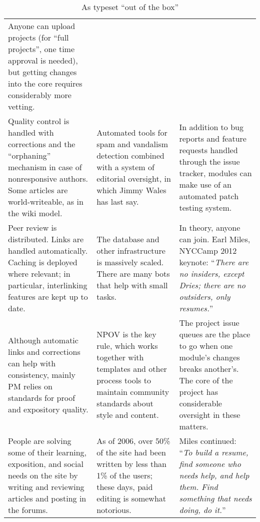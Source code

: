 \documentclass[article,a4paper,12pt,twoside]{memoir}
\newcounter{123listcolonstylectr}
\begin{document}
\begin{table}
\begin{center}
{\begin{tabular}{|p{}|p{}|p{}|}
Anyone can upload projects (for ``full projects'', one time approval
is needed), but getting changes into the core requires considerably
more vetting. \\
Quality control is handled with corrections and the ``orphaning'' mechanism
in case of nonresponsive authors.  Some articles are world-writeable,
as in the wiki model. & Automated tools for spam and vandalism detection
combined with a system of editorial oversight, in which Jimmy Wales
has last say. & In addition to bug reports and feature requests handled
through the issue tracker, modules can make use of an automated patch
testing system.\\
Peer review is distributed.  Links are handled automatically.  Caching
is deployed where relevant; in particular, interlinking features are
kept up to date. & The database and other infrastructure is massively
scaled. There are many bots that help with small tasks. & In theory,
anyone can join.  Earl Miles, NYCCamp 2012 keynote: ``\emph{There are
  no insiders, except Dries; there are no outsiders, only resumes.}''
\\
Although automatic links and corrections can help with consistency,
mainly PM relies on standards for proof and expository quality.
&NPOV is the key rule, which works together with templates and other
process tools to maintain community standards about style and
content. & The project issue queues are the place to go when one
module's changes breaks another's. The core of the project has
considerable oversight in these
matters.\\
People are solving some of their learning, exposition, and social
needs on the site by writing and reviewing articles and posting in the
forums.& As of 2006, over 50\% of the site had been written by less
than 1\% of the users; these days, paid editing is somewhat
notorious.& Miles continued: ``\emph{To build a resume, find someone
  who needs help, and help them.  Find something that needs doing, do
  it.}'' \\ \hline
\end{tabular}
}
\end{center}
\caption{As typeset ``out of the box''}
\end{table}
\end{document}
